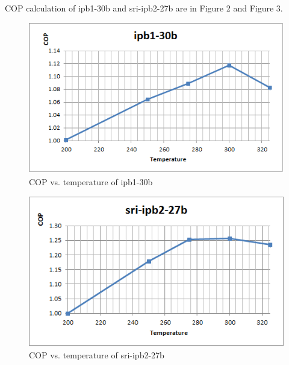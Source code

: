 \documentclass{article}
\begin{document}
COP calculation of ipb1-30b and sri-ipb2-27b are in Figure 2 and Figure 3.
\begin{figure}
[h]
\includegraphics[scale=1.0]{ipb-30b.png} 
\caption{COP vs. temperature of ipb1-30b}%
\end{figure}

\begin{figure}
\includegraphics[scale=1.0]{sri-ipb2-27b.png} 
\caption{COP vs. temperature of sri-ipb2-27b}%
\end{figure} 
\end{document}
